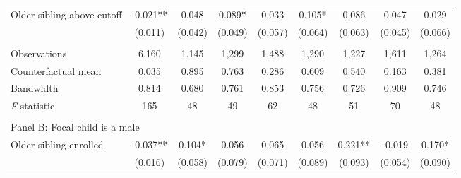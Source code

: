 \begin{table}[!htbp]
{{\begin{tabular}{lcccccccc}
Older sibling above cutoff&      -0.021** &       0.048   &       0.089*  &       0.033   &       0.105*  &       0.086   &       0.047   &       0.029   \\
                    &     (0.011)   &     (0.042)   &     (0.049)   &     (0.057)   &     (0.064)   &     (0.063)   &     (0.045)   &     (0.066)   \\
                    &               &               &               &               &               &               &               &               \\
Observations        &       6,160   &       1,145   &       1,299   &       1,488   &       1,290   &       1,227   &       1,611   &       1,264   \\
Counterfactual mean &       0.035   &       0.895   &       0.763   &       0.286   &       0.609   &       0.540   &       0.163   &       0.381   \\
Bandwidth           &       0.814   &       0.680   &       0.761   &       0.853   &       0.756   &       0.726   &       0.909   &       0.746   \\
\textit{F}-statistic&         165   &          48   &          49   &          62   &          48   &          51   &          70   &          48   \\
 
&  &  &  & & & & & \\
\multicolumn{10}{l}{Panel B: Focal child is a male} \\
Older sibling enrolled&      -0.037** &       0.104*  &       0.056   &       0.065   &       0.056   &       0.221** &      -0.019   &       0.170*  \\
                    &     (0.016)   &     (0.058)   &     (0.079)   &     (0.071)   &     (0.089)   &     (0.093)   &     (0.054)   &     (0.090)   \\
 

\end{tabular}}}
\end{table}
